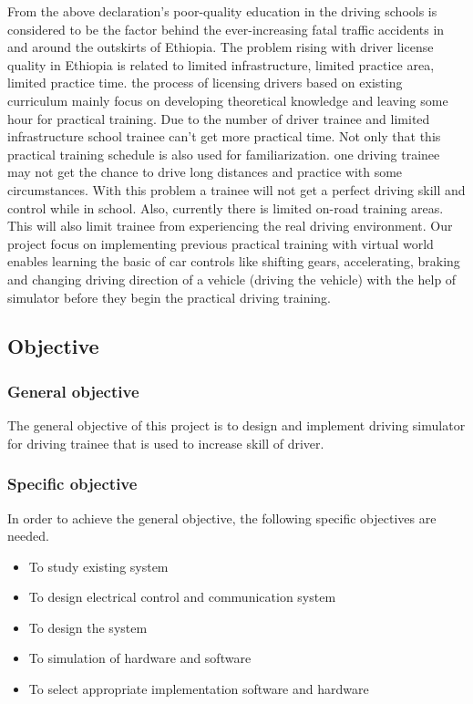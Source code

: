 \documentclass[12pt,a4paper]{article}
\begin{document}
From the above declaration’s poor-quality education in the driving schools is
considered to be the factor behind the ever-increasing fatal traffic accidents in and
around the outskirts of Ethiopia. The problem rising with driver license quality in
Ethiopia is related to limited infrastructure, limited practice area, limited practice
time. the process of licensing drivers based on existing curriculum mainly focus
on developing theoretical knowledge and leaving some hour for practical training.
Due to the number of driver trainee and limited infrastructure school trainee can’t
get more practical time. Not only that this practical training schedule is also
used for familiarization. one driving trainee may not get the chance to drive long
distances and practice with some circumstances. With this problem a trainee will
not get a perfect driving skill and control while in school. Also, currently there is
limited on-road training areas. This will also limit trainee from experiencing the
real driving environment.
Our project focus on implementing previous practical training with virtual
world enables learning the basic of car controls like shifting gears, accelerating,
braking and changing driving direction of a vehicle (driving the vehicle) with the
help of simulator before they begin the practical driving training.

\subsection{Objective }
\subsubsection{General objective}
The general objective of this project is to design and implement driving simulator for driving trainee that is used to increase skill of driver.
\\

\subsubsection{Specific objective}
In order to achieve the general objective, the following specific objectives are needed.
\begin{itemize}
	\item 
	To study existing system
	\item 
	To design electrical control and communication system
	\item 
	To design the system
	\item 
	To simulation of hardware and software
		\item 
	To select appropriate implementation software and hardware
\end{itemize}
\end{document}

